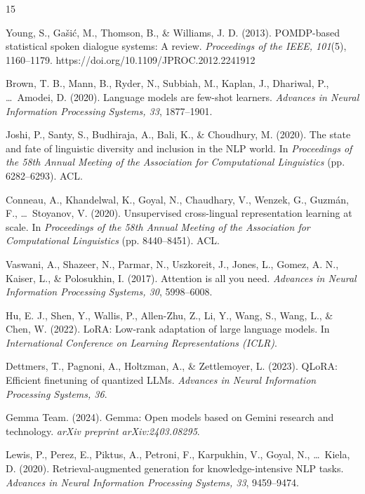 \documentclass[12pt,a4paper]{report}
\begin{document}
\renewcommand{\bibname}{References}
\begin{thebibliography}{15}

Young, S., Ga\v{s}i\'{c}, M., Thomson, B., \& Williams, J. D. (2013). POMDP-based statistical spoken dialogue systems: A review. \textit{Proceedings of the IEEE, 101}(5), 1160--1179. https://doi.org/10.1109/JPROC.2012.2241912

Brown, T. B., Mann, B., Ryder, N., Subbiah, M., Kaplan, J., Dhariwal, P., \ldots\ Amodei, D. (2020). Language models are few-shot learners. \textit{Advances in Neural Information Processing Systems, 33}, 1877--1901.

Joshi, P., Santy, S., Budhiraja, A., Bali, K., \& Choudhury, M. (2020). The state and fate of linguistic diversity and inclusion in the NLP world. In \textit{Proceedings of the 58th Annual Meeting of the Association for Computational Linguistics} (pp. 6282--6293). ACL.

Conneau, A., Khandelwal, K., Goyal, N., Chaudhary, V., Wenzek, G., Guzm{\'a}n, F., \ldots\ Stoyanov, V. (2020). Unsupervised cross-lingual representation learning at scale. In \textit{Proceedings of the 58th Annual Meeting of the Association for Computational Linguistics} (pp. 8440--8451). ACL.

Vaswani, A., Shazeer, N., Parmar, N., Uszkoreit, J., Jones, L., Gomez, A. N., Kaiser, L., \& Polosukhin, I. (2017). Attention is all you need. \textit{Advances in Neural Information Processing Systems, 30}, 5998--6008.

Hu, E. J., Shen, Y., Wallis, P., Allen-Zhu, Z., Li, Y., Wang, S., Wang, L., \& Chen, W. (2022). LoRA: Low-rank adaptation of large language models. In \textit{International Conference on Learning Representations (ICLR)}.

Dettmers, T., Pagnoni, A., Holtzman, A., \& Zettlemoyer, L. (2023). QLoRA: Efficient finetuning of quantized LLMs. \textit{Advances in Neural Information Processing Systems, 36}.

Gemma Team. (2024). Gemma: Open models based on Gemini research and technology. \textit{arXiv preprint arXiv:2403.08295}.

Lewis, P., Perez, E., Piktus, A., Petroni, F., Karpukhin, V., Goyal, N., \ldots\ Kiela, D. (2020). Retrieval-augmented generation for knowledge-intensive NLP tasks. \textit{Advances in Neural Information Processing Systems, 33}, 9459--9474.


\end{thebibliography}
\end{document}
